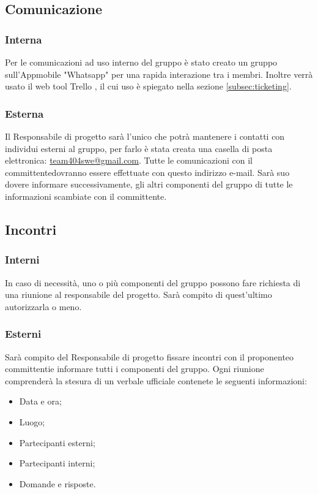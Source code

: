 \documentclass[a4paper,11pt]{article}
\begin{document}
				
		
		\subsection{Comunicazione}
			\subsubsection{Interna}			
			Per le comunicazioni ad uso interno del gruppo è stato creato un gruppo sull'App\addglos mobile "Whatsapp" per una rapida interazione tra i membri. Inoltre verrà usato il web tool Trello \addglos, il cui uso è spiegato nella sezione \ref{subsec:ticketing}.
			\subsubsection{Esterna}
			Il Responsabile di progetto sarà l'unico che potrà mantenere i contatti con individui esterni al gruppo, per farlo è stata creata una casella di posta elettronica: \url{team404swe@gmail.com}. Tutte le comunicazioni con il committente\addglos dovranno essere effettuate con questo indirizzo e-mail. Sarà suo dovere informare successivamente, gli altri componenti del gruppo di tutte le informazioni scambiate con il committente.
		\subsection{Incontri}
		\subsubsection{Interni}
		In caso di necessità, uno o più componenti del gruppo possono fare richiesta di una riunione al responsabile del progetto. Sarà compito di quest'ultimo autorizzarla o meno. 
		\subsubsection{Esterni}
		Sarà compito del Responsabile di progetto fissare incontri con il proponente\addglos o committenti\addglos e informare tutti i componenti del gruppo. Ogni riunione comprenderà la stesura di un verbale ufficiale contenete le seguenti informazioni:
\begin{itemize}
\item Data e ora;
\item Luogo;
\item Partecipanti esterni;
\item Partecipanti interni;
\item Domande e risposte.
\end{itemize}
		
\end{document}
